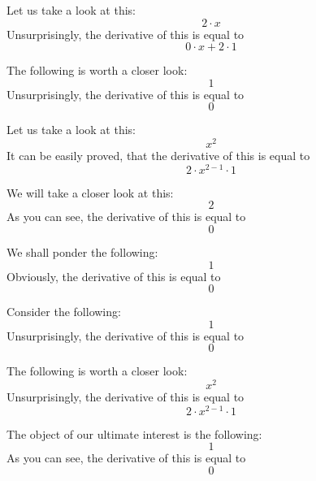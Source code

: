 \documentclass{article}
\begin{document}
Let us take a look at this:
\begin{equation}
2 \cdot x 
\end{equation}
Unsurprisingly, the derivative of this is equal to
\begin{equation}
0 \cdot x + 2 \cdot 1 
\end{equation}

The following is worth a closer look:
\begin{equation}
1 
\end{equation}
Unsurprisingly, the derivative of this is equal to
\begin{equation}
0 
\end{equation}

Let us take a look at this:
\begin{equation}
x ^{2 } 
\end{equation}
It can be easily proved, that the derivative of this is equal to
\begin{equation}
2 \cdot x ^{2 - 1 } \cdot 1 
\end{equation}

We will take a closer look at this:
\begin{equation}
2 
\end{equation}
As you can see, the derivative of this is equal to
\begin{equation}
0 
\end{equation}

We shall ponder the following:
\begin{equation}
1 
\end{equation}
Obviously, the derivative of this is equal to
\begin{equation}
0 
\end{equation}

Consider the following:
\begin{equation}
1 
\end{equation}
Unsurprisingly, the derivative of this is equal to
\begin{equation}
0 
\end{equation}

The following is worth a closer look:
\begin{equation}
x ^{2 } 
\end{equation}
Unsurprisingly, the derivative of this is equal to
\begin{equation}
2 \cdot x ^{2 - 1 } \cdot 1 
\end{equation}

The object of our ultimate interest is the following:
\begin{equation}
1 
\end{equation}
As you can see, the derivative of this is equal to
\begin{equation}
0 
\end{equation}
\end{document}
